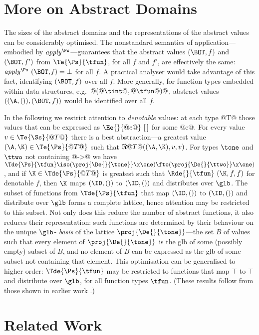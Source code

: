 \documentclass[11pt]{article}
\begin{document}
\section{More on Abstract Domains}

The sizes of the abstract domains and the representations of the
abstract values can be considerably optimised.  The nonstandard
semantics of application---embodied by $\it apply^{\Ps}$---guarantees
that the abstract values $(\BOT,f)$ and $(\BOT,f')$ from
$\Te{\Ps}{\tfun}$, for all $f$ and $f'$, are effectively the same:
$\it apply^{\Ps}~(\BOT,f)=\bot$ for all $f$.  A practical analyser
would take advantage of this fact, identifying $(\BOT,f)$ over all
$f$.  More generally, for function types embedded within data
structures, e.g.\ $@(@\tint@,@\tfun@)@$, abstract values
$((\A,()),(\BOT,f))$ would be identified over all $f$.

In the following we restrict attention to {\it denotable\/} values: at
each type @T@ those values that can be expressed as $\Ee{}{@e@}~[\,]$
for some @e@.  For every value $v\in\Te{\Ss}{@T@}$ there is a best
abstraction---a greatest value $(\A,\K)\in\Te{\Ps}{@T@}$ such that
$\Re{}{@T@}((\A,\K),v,v)$.  For types $\tone$ and $\ttwo$ not
containing @->@ we have
$\Tde{\Ps}{\tfun}\iso(\proj{\De{}{\tone}}\x\one)\fto(\proj{\De{}{\ttwo}}\x\one)$,
and if $\K\in\Tde{\Ps}{@T@}$ is greatest such that
$\Rde{}{\tfun}~(\K,f,f)$ for denotable $f$, then $\K$ maps $(\ID,())$
to $(\ID,())$ and distributes over $\glb$.  The subset of functions
from $\Tde{\Ps}{\tfun}$ that map $(\ID,())$ to $(\ID,())$ and
distribute over $\glb$ forms a complete lattice, hence attention may
be restricted to this subset.  Not only does this reduce the number of
abstract functions, it also reduces their representation: such
functions are determined by their behaviour on the unique $\glb$-{\it
basis\/} of the lattice $\proj{\De{}{\tone}}$---the set $B$ of values
such that every element of $\proj{\De{}{\tone}}$ is the glb of some
(possibly empty) subset of $B$, and no element of $B$ can be expressed
as the glb of some subset not containing that element.  This
optimisation can be generalised to higher order: $\Tde{\Ps}{\tfun}$
may be restricted to functions that map $\top$ to $\top$ and
distribute over $\glb$, for all function types $\tfun$.  (These
results follow from those shown in earlier work \cite{Dav94}.)

\section{Related Work}
\end{document}
